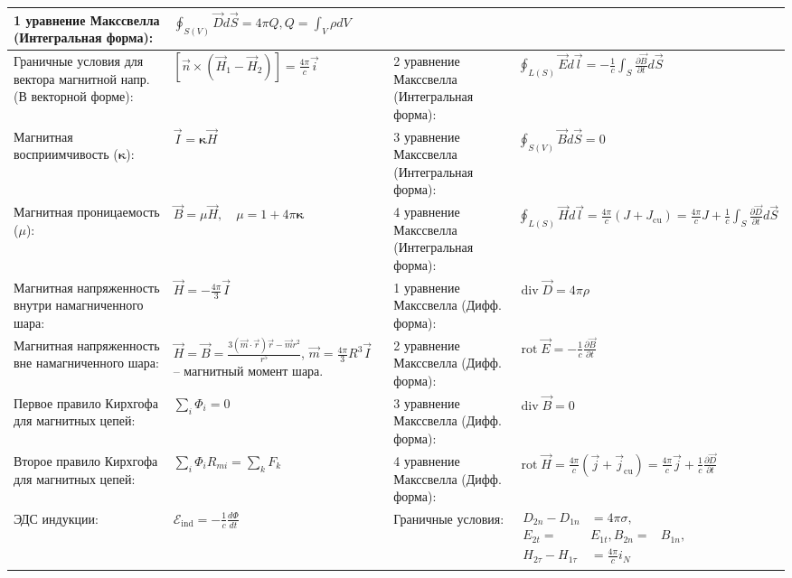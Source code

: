 \documentclass{article}
\begin{document}
\begin{tabular}{ |p{6cm}|p{3.5cm}|p{6cm}|p{3.5cm}|  }
1 уравнение Макссвелла (Интегральная форма):&
$\oint_{S(V)} \vec{D} d \vec{S}=4 \pi Q, Q=\int_{V} \rho d V$\\
\hline
Граничные условия для вектора магнитной напр. (В векторной форме): &
$ [\vec{n} \times \left(\vec{H}_{1}-\vec{H}_{2}\right)]=\frac{4 \pi}{c} \vec{i}$ &
2 уравнение Макссвелла (Интегральная форма):&
$\oint_{L(S)} \vec{E} d \vec{l}=-\frac{1}{c} \int_{S} \frac{\partial \vec{B}}{\partial t} d \vec{S}$\\
\hline
Магнитная восприимчивость ($\boldsymbol{\kappa}$):&
$\vec{I}=\boldsymbol{\kappa} \vec{H}$&
3 уравнение Макссвелла (Интегральная форма):&
$\oint_{S(V)} \vec{B} d \vec{S}=0$\\
\hline
Магнитная проницаемость ($\mu$): &
$\vec{B}=\mu \vec{H}, \quad \mu=1+4 \pi \boldsymbol{\kappa}$ &
4 уравнение Макссвелла (Интегральная форма):&
$\oint_{L(S)} \vec{H} d \vec{l}=\frac{4 \pi}{c}\left(J+J_{\mathrm{cu}}\right)=\frac{4 \pi}{c} J+\frac{1}{c} \int_{S} \frac{\partial \vec{D}}{\partial t} d \vec{S}$\\
\hline
Магнитная напряженность внутри намагниченного шара: &
$\vec{H}=-\frac{4 \pi}{3} \vec{I}$&
1 уравнение Макссвелла (Дифф. форма): &
$\operatorname{div} \vec{D}=4 \pi \rho$\\
\hline
Магнитная напряженность вне намагниченного шара: &
$\vec{H}=\vec{B}=\frac{3(\vec{m} \cdot \vec{r}) \vec{r}-\vec{m} r^{2}}{r^{5}}$, $\vec{m}=\frac{4 \pi}{3} R^{3} \vec{I}$ -- магнитный момент шара.&
2 уравнение Макссвелла (Дифф. форма):&
$\operatorname{rot} \vec{E}=-\frac{1}{c} \frac{\partial \vec{B}}{\partial t}$\\
\hline
Первое правило Кирхгофа для магнитных цепей: &
$\sum_{i} \Phi_{i}=0$&
3 уравнение Макссвелла (Дифф. форма):&
$\operatorname{div} \vec{B}=0$\\
\hline
Второе правило Кирхгофа для магнитных цепей: &
$\sum_{i} \Phi_{i} R_{m i}=\sum_{k} F_{k}$ &
4 уравнение Макссвелла (Дифф. форма):&
$\operatorname{rot} \vec{H}=\frac{4 \pi}{c}\left(\vec{j}+\vec{j}_{\mathrm{cu}}\right)=\frac{4 \pi}{c} \vec{j}+\frac{1}{c} \frac{\partial \vec{D}}{\partial t}$\\
\hline
ЭДС индукции: &
$\mathcal{E}_{\mathrm{ind}}=-\frac{1}{c} \frac{d \Phi}{d t}$&
Граничные условия: &
$\begin{aligned}
D_{2 n}-D_{1 n} &=4 \pi \sigma, \\ E_{2 t}=& E_{1 t}, B_{2 n}=& B_{1 n}, \\ H_{2 \tau}-H_{1 \tau} &=\frac{4 \pi}{c} i_{N}
\end{aligned}$\\

\end{tabular}
\end{document}
